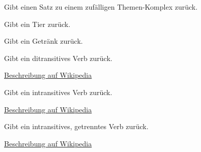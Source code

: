 \documentclass[a4paper,12pt,oneside]{sphinxmanual}
\begin{document}

\begin{fulllineitems}
\label{funktionen:pyzufall.themen_satz}
Gibt einen Satz zu einem zufälligen Themen-Komplex zurück.

\end{fulllineitems}


\begin{fulllineitems}
\label{funktionen:pyzufall.tier}
Gibt ein Tier zurück.

\end{fulllineitems}


\begin{fulllineitems}
\label{funktionen:pyzufall.trinken}
Gibt ein Getränk zurück.

\end{fulllineitems}


\begin{fulllineitems}
\label{funktionen:pyzufall.verbd}
Gibt ein ditransitives Verb zurück.

\href{http://de.wikipedia.org/wiki/Transitivität\_(Grammatik)\#Festlegung\_der\_Transitivit.C3.A4t\_eines\_Verbs/}{Beschreibung auf Wikipedia}

\end{fulllineitems}


\begin{fulllineitems}
\label{funktionen:pyzufall.verbi}
Gibt ein intransitives Verb zurück.

\href{http://de.wikipedia.org/wiki/Transitivität\_(Grammatik)\#Festlegung\_der\_Transitivit.C3.A4t\_eines\_Verbs/}{Beschreibung auf Wikipedia}

\end{fulllineitems}


\begin{fulllineitems}
\label{funktionen:pyzufall.verbi2}
Gibt ein intransitives, getrenntes Verb zurück.

\href{http://de.wikipedia.org/wiki/Transitivität\_(Grammatik)\#Festlegung\_der\_Transitivit.C3.A4t\_eines\_Verbs/}{Beschreibung auf Wikipedia}

\end{fulllineitems}
\end{document}
